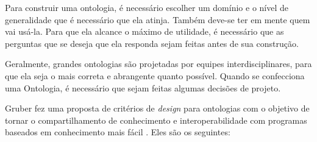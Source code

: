 Para construir uma ontologia, é necessário escolher um domínio e o nível de generalidade que é necessário que ela atinja. Também deve-se ter em mente quem vai usá-la. Para que ela alcance o máximo de utilidade, é necessário que as perguntas que se deseja que ela responda sejam feitas antes de sua construção.

Geralmente, grandes ontologias são projetadas por equipes interdisciplinares, para que ela seja o mais correta e abrangente quanto possível. Quando se confecciona uma Ontologia, é necessário que sejam feitas algumas decisões de projeto.  

Gruber fez uma proposta de critérios de \textit{design} para ontologias com o objetivo de tornar o compartilhamento de conhecimento e interoperabilidade com programas baseados em conhecimento mais fácil \citep{ontoGruber}. Eles são os seguintes:

